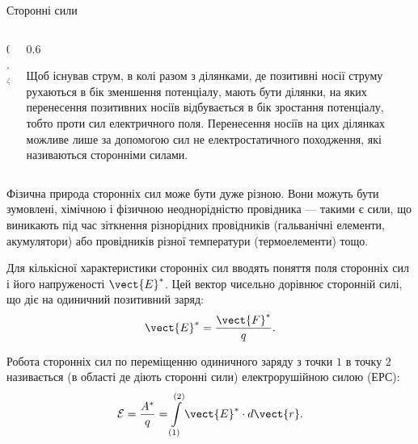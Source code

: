 \documentclass[onlytextwidth]{beamer}
\begin{document}
\begin{frame}{Сторонні сили}{}
	\begin{columns}
		\begin{column}{0.4\linewidth}\centering
			
		\end{column}
		\begin{column}{0.6\linewidth}
			\begin{block}{}\justifying
				Щоб існував струм, в колі разом з ділянками, де позитивні носії струму рухаються в бік зменшення потенціалу,
				мають бути ділянки, на яких перенесення позитивних носіїв відбувається в бік зростання потенціалу, тобто
				\alert{проти сил електричного поля}. Перенесення носіїв на цих ділянках можливе лише за допомогою
				\alert{сил не електростатичного походження}, які називаються \alert{сторонніми силами}.
			\end{block}
		\end{column}
	\end{columns}
	\begin{overprint}
		\begin{block}{}\justifying\small
			Фізична природа сторонніх сил може бути дуже різною. Вони можуть бути зумовлені, хімічною і
			фізичною неоднорідністю провідника --- такими є сили,
			що виникають під час зіткнення різнорідних провідників (гальванічні елементи, акумулятори)
			або провідників різної температури (термоелементи) тощо.
		\end{block}
		\begin{block}{}\justifying
			Для кількісної характеристики сторонніх сил вводять поняття \alert{поля сторонніх сил і його напруженості} $\vect{E}^*$. Цей вектор чисельно
			дорівнює
			сторонній силі, що діє на одиничний позитивний заряд:
			\begin{equation*}
				\vect{E}^* = \frac{\vect{F}^*}q.
			\end{equation*}
		\end{block}
		Робота сторонніх сил по переміщенню одиничного заряду з точки $1$ в точку $2$ називається (в області де діють сторонні сили) \alert{електрорушійною
			силою (ЕРС)}:
		\begin{equation*}
			\mathcal{E} = \frac{A^*}{q} = \int\limits_{(1)}^{(2)}\vect{E}^*\cdot d\vect{r}.
		\end{equation*}
	\end{overprint}
\end{frame}
\end{document}
